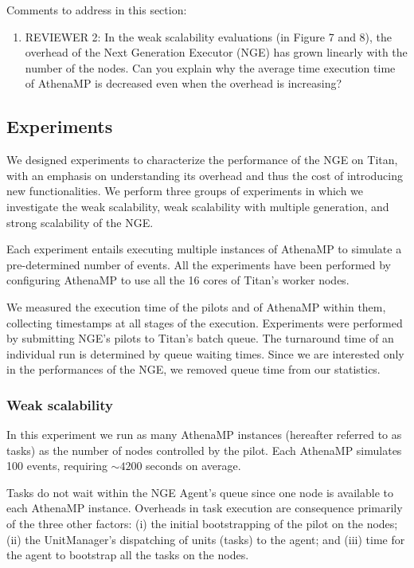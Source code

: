 Comments to address in this section:
\begin{enumerate}
    \item REVIEWER 2: In the weak scalability evaluations (in Figure 7 and
    8), the overhead of the Next Generation Executor (NGE) has grown linearly
    with the number of the nodes. Can you explain why the average time
    execution time of AthenaMP is decreased even when the overhead is
    increasing?
\end{enumerate}

\subsection{Experiments}
\label{sec:ngeExp}

We designed experiments to characterize the performance of the NGE on Titan,
with an emphasis on understanding its overhead and thus the cost of
introducing new functionalities. We perform three groups of experiments in
which we investigate the weak scalability, weak scalability with multiple
generation, and strong scalability of the NGE.

Each experiment entails executing multiple instances of AthenaMP to simulate
a pre-determined number of events. All the experiments have been performed by
configuring AthenaMP to use all the 16 cores of Titan's worker nodes.

We measured the execution time of the pilots and of AthenaMP within them,
collecting timestamps at all stages of the execution. Experiments were
performed by submitting NGE's pilots to Titan's batch queue. The turnaround
time of an individual run is determined by queue waiting times. Since we are
interested only in the performances of the NGE, we removed queue time from
our statistics.

\subsubsection{Weak scalability}

In this experiment we run as many AthenaMP instances (hereafter referred to
as tasks) as the number of nodes controlled by the pilot. Each AthenaMP
simulates 100 events, requiring $\sim 4200$ seconds on average.

Tasks do not wait within the NGE Agent's queue since one node is available to
each AthenaMP instance. Overheads in task execution are consequence primarily
of the three other factors: (i) the initial bootstrapping of the pilot on the
nodes; (ii) the UnitManager's dispatching of units (tasks) to the agent; and
(iii) time for the agent to bootstrap all the tasks on the nodes.

